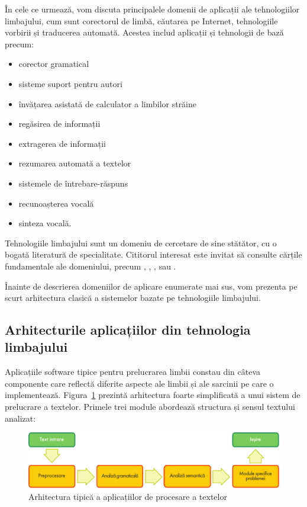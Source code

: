 \begin{multicols}{2}
În cele ce urmează, vom discuta principalele domenii de aplicații ale tehnologiilor limbajului, cum sunt corectorul de limbă, căutarea pe Internet, tehnologiile vorbirii și traducerea automată. Acestea includ aplicații și tehnologii de bază precum:

\begin{itemize}
\item corector gramatical
\item sisteme suport pentru autori
\item învățarea asistată de calculator a limbilor străine
\item regăsirea de informații
\item extragerea de informații
\item rezumarea automată a textelor
\item sistemele de întrebare-răspuns
\item recunoașterea vocală
\item sinteza vocală.
\end{itemize}

Tehnologiile limbajului sunt un domeniu de cercetare de sine stătător, cu o bogată literatură de specialitate. Cititorul interesat este invitat să consulte cărțile fundamentale ale domeniului, precum \cite{carstensen-etal1}, \cite{jurafsky-martin01}, \cite{manning-schuetze1}, \cite{lt-world1} sau \cite{lt-survey1}.

Înainte de descrierea domeniilor de aplicare enumerate mai sus, vom prezenta pe scurt arhitectura clasică a sistemelor bazate pe tehnologiile limbajului.

\subsection{Arhitecturile aplicațiilor din tehnologia limbajului}

Aplicațiile software tipice pentru prelucrarea limbii constau din câteva componente care reflectă diferite aspecte ale limbii și ale sarcinii pe care o implementează. Figura~\ref{fig:textprocessingarch_de} prezintă arhitectura foarte simplificată a unui sistem de prelucrare a textelor. Primele trei module abordează structura și sensul textului analizat:

\begin{figure}[b]
\center
\includegraphics[width=\textwidth]{../_media/romanian/text_processing_app_architecture}
\caption{Arhitectura tipică a aplicațiilor de procesare a textelor}
\label{fig:textprocessingarch_de}
\end{figure}


\end{multicols}
